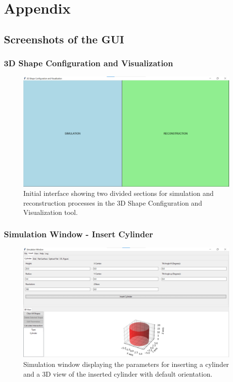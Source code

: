 \documentclass[../main.tex]{subfiles}
\begin{document}
\chapter{Appendix}
\section{Screenshots of the GUI}

\subsection{3D Shape Configuration and Visualization}
\begin{figure}[H]
\centering
\includegraphics[width=\textwidth]{Images/Appendix/main}
\caption{Initial interface showing two divided sections for simulation and reconstruction processes in the 3D Shape Configuration and Visualization tool.}
\end{figure}

\subsection{Simulation Window - Insert Cylinder}
\begin{figure}[H]
\centering
\includegraphics[width=\textwidth]{Images/Appendix/simulation/cylinder}
\caption{Simulation window displaying the parameters for inserting a cylinder and a 3D view of the inserted cylinder with default orientation.}
\end{figure}
\end{document}
